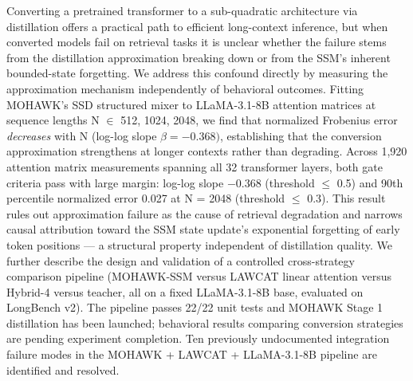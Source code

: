 
Converting a pretrained transformer to a sub-quadratic architecture via distillation offers a practical path to efficient long-context inference, but when converted models fail on retrieval tasks it is unclear whether the failure stems from the distillation approximation breaking down or from the SSM's inherent bounded-state forgetting. We address this confound directly by measuring the approximation mechanism independently of behavioral outcomes. Fitting MOHAWK's SSD structured mixer to LLaMA-3.1-8B attention matrices at sequence lengths N $\in$ {512, 1024, 2048}, we find that normalized Frobenius error \textit{decreases} with N (log-log slope $\beta = -0.368)$, establishing that the conversion approximation strengthens at longer contexts rather than degrading. Across 1,920 attention matrix measurements spanning all 32 transformer layers, both gate criteria pass with large margin: log-log slope $-0.368$ (threshold $\leq$ 0.5) and 90th percentile normalized error 0.027 at N = 2048 (threshold $\leq$ 0.3). This result rules out approximation failure as the cause of retrieval degradation and narrows causal attribution toward the SSM state update's exponential forgetting of early token positions --- a structural property independent of distillation quality. We further describe the design and validation of a controlled cross-strategy comparison pipeline (MOHAWK-SSM versus LAWCAT linear attention versus Hybrid-4 versus teacher, all on a fixed LLaMA-3.1-8B base, evaluated on LongBench v2). The pipeline passes 22/22 unit tests and MOHAWK Stage 1 distillation has been launched; behavioral results comparing conversion strategies are pending experiment completion. Ten previously undocumented integration failure modes in the MOHAWK + LAWCAT + LLaMA-3.1-8B pipeline are identified and resolved.

